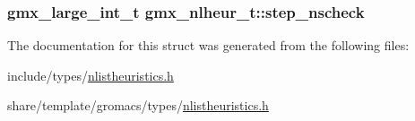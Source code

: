 \hypertarget{structgmx__nlheur__t_ad4e72c22a0f88f77e74c70a4ad19021b}{
\subsubsection[{step\-\_\-nscheck}]{\setlength{\rightskip}{0pt plus 5cm}gmx\-\_\-large\-\_\-int\-\_\-t {\bf gmx\-\_\-nlheur\-\_\-t\-::step\-\_\-nscheck}}}\label{structgmx__nlheur__t_ad4e72c22a0f88f77e74c70a4ad19021b}


\-The documentation for this struct was generated from the following files\-:\begin{DoxyCompactItemize}
\item 
include/types/\hyperlink{include_2types_2nlistheuristics_8h}{nlistheuristics.\-h}\item 
share/template/gromacs/types/\hyperlink{share_2template_2gromacs_2types_2nlistheuristics_8h}{nlistheuristics.\-h}\end{DoxyCompactItemize}
